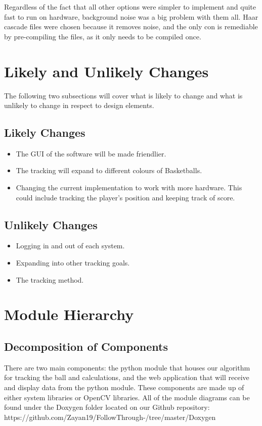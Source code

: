 Regardless of the fact that all other options were simpler to implement and quite fast to run on hardware, background noise was a big problem with them all. Haar cascade files were chosen because it removes noise, and the only con is remediable by pre-compiling the files, as it only needs to be compiled once.

\section{Likely and Unlikely Changes}
The following two subsections will cover what is likely to change and what is unlikely to change in respect to design elements.

\subsection{Likely Changes}
\begin{itemize}
    \item The GUI of the software will be made friendlier.
    \item The tracking will expand to different colours of Basketballs.
    \item Changing the current implementation to work with more hardware. This could include tracking the player's position and keeping track of score. 
\end{itemize}

\subsection{Unlikely Changes}
\begin{itemize}
    \item Logging in and out of each system.
    \item Expanding into other tracking goals.
    \item The tracking method. 
\end{itemize}

\section{Module Hierarchy}
\subsection{Decomposition of Components}
There are two main components: the python module that houses our algorithm for tracking the ball and calculations, and the web application that will receive and display data from the python module. These components are made up of either system libraries or OpenCV libraries. All of the module diagrams can be found under the Doxygen folder located on our Github repository: https://github.com/Zayan19/FollowThrough-/tree/master/Doxygen

